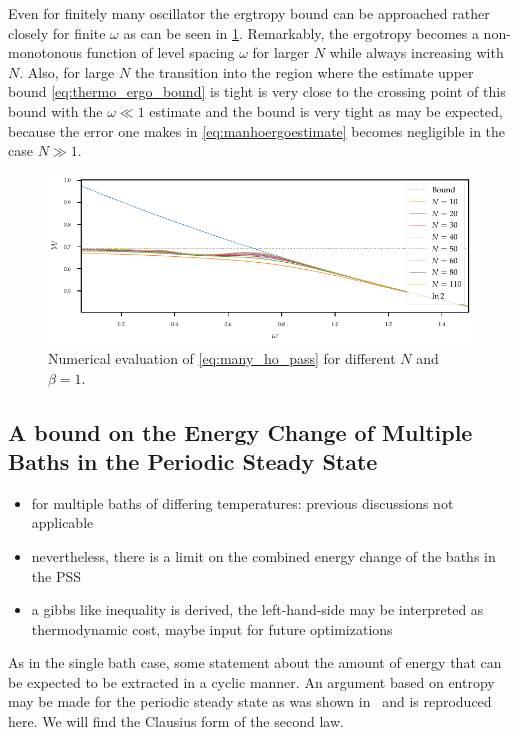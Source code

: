 Even for finitely many oscillator the ergtropy bound can be approached
rather closely for finite \(ω\) as can be seen in
\cref{fig:numeric_n_ho_ergo_nonmon}. Remarkably, the ergotropy becomes
a non-monotonous function of level spacing \(ω\) for larger \(N\)
while always increasing with \(N\). Also, for large \(N\) the
transition into the region where the estimate upper bound
\cref{eq:thermo_ergo_bound} is tight is very close to the crossing
point of this bound with the \(ω\ll 1\) estimate and the bound is very
tight as may be expected, because the error one makes in
\cref{eq:manhoergoestimate} becomes negligible in the case \(N\gg 1\).
\begin{figure}[hp]
  \includegraphics{figs/ergo_calc/ergo_nonmonotonic}
  \caption{\label{fig:numeric_n_ho_ergo_nonmon} Numerical evaluation of
    \cref{eq:many_ho_pass} for different \(N\) and \(β=1\).}
\end{figure}


\subsection{A bound on the Energy Change of Multiple Baths in the
  Periodic Steady State}
\label{sec:operational_thermo}
\begin{itemize}
\item for multiple baths of differing temperatures: previous
  discussions not applicable
\item nevertheless, there is a limit on the combined energy change of
  the baths in the PSS
\item a gibbs like inequality is derived, the left-hand-side may be
  interpreted as thermodynamic cost, maybe input for future optimizations
\end{itemize}
As in the single bath case, some statement about the amount of energy
that can be expected to be extracted in a cyclic manner. An argument
based on entropy may be made for the periodic steady state as was
shown in~\cite{Kato2016Dec} and is reproduced here. We will find the
Clausius form of the second law.

